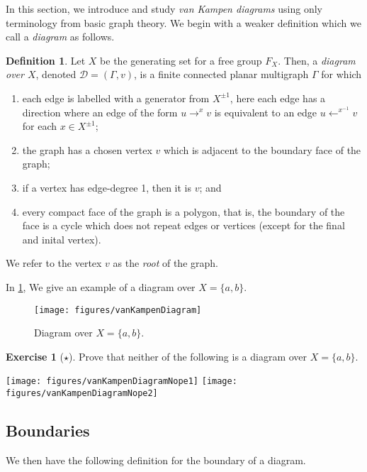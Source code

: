 \documentclass[11pt,a4paper,reqno]{amsart}
\theoremstyle{plain}
\theoremstyle{definition}
\newtheorem{definition}[theorem]{Definition}
\theoremstyle{definition}
\newtheorem{exercise}[theorem]{Exercise}
\newcommand\exerciseLevelEasy{$\star$}
\begin{document}
In this section, we introduce and study \emph{van Kampen diagrams} using only terminology from basic graph theory.
We begin with a weaker definition which we call a \emph{diagram} as follows.

\begin{definition}\label{def:diagram}
	Let $X$ be the generating set for a free group $F_X$.
	Then, a \emph{diagram over $X$}, denoted $\mathcal D = (\Gamma,v)$, is a finite connected planar multigraph $\Gamma$ for which
	\begin{enumerate}
		\item each edge is labelled with a generator from $X^{\pm 1}$, here each edge has a direction where an edge of the form $u\to^{x} v$ is equivalent to an edge $u\leftarrow^{x^{-1}} v$ for each $x\in X^{\pm 1}$;
		\item the graph has a chosen vertex $v$ which is adjacent to the boundary face of the graph;
		\item if a vertex has edge-degree 1, then it is $v$; and
		\item every compact face of the graph is a polygon, that is, the boundary of the face is a cycle which does not repeat edges or vertices (except for the final and inital vertex).
	\end{enumerate}
	We refer to the vertex $v$ as the \emph{root} of the graph.
\end{definition}

In \cref{fig:diagram}, We give an example of a diagram over $X=\{a,b\}$.

\begin{figure}[ht!]
	\centering
	\texttt{[image: figures/vanKampenDiagram]}
	\caption{Diagram over $X = \{a,b\}$.}\label{fig:diagram}
\end{figure}

\begin{exercise}[\exerciseLevelEasy]
	Prove that neither of the following is a diagram over $X = \{a,b\}$.

		{
			\hfill
			\texttt{[image: figures/vanKampenDiagramNope1]}
			\hfill
			\texttt{[image: figures/vanKampenDiagramNope2]}
			\hfill
		}

\end{exercise}

\subsection{Boundaries}

We then have the following definition for the boundary of a diagram.
\end{document}
